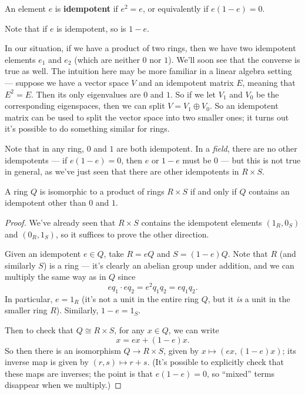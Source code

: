 \begin{definition}
    An element $e$ is \textbf{idempotent} if $e^2 = e$, or equivalently if $e(1 - e) = 0$. 
\end{definition}

Note that if $e$ is idempotent, so is $1 - e$. 

In our situation, if we have a product of two rings, then we have two idempotent elements $e_1$ and $e_2$ (which are neither $0$ nor $1$). We'll soon see that the converse is true as well. The intuition here may be more familiar in a linear algebra setting --- suppose we have a vector space $V$ and an idempotent matrix $E$, meaning that $E^2 = E$. Then its only eigenvalues are $0$ and $1$. So if we let $V_1$ and $V_0$ be the corresponding eigenspaces, then we can split $V = V_1 \oplus V_0$. So an idempotent matrix can be used to split the vector space into two smaller ones; it turns out it's possible to do something similar for rings.

Note that in any ring, $0$ and $1$ are both idempotent. In a \emph{field}, there are no other idempotents --- if $e(1 - e) = 0$, then $e$ or $1 - e$ must be $0$ --- but this is not true in general, as we've just seen that there are other idempotents in $R \times S$.

\begin{proposition}
A ring $Q$ is isomorphic to a product of rings $R \times S$ if and only if $Q$ contains an idempotent other than $0$ and $1$. 
\end{proposition}

\begin{proof}
We've already seen that $R \times S$ contains the idempotent elements $(1_R, 0_S)$ and $(0_R, 1_S)$, so it suffices to prove the other direction.  

Given an idempotent $e \in Q$, take $R = eQ$ and $S = (1 - e)Q$. Note that $R$ (and similarly $S$) is a ring --- it's clearly an abelian group under addition, and we can multiply the same way as in $Q$ since \[eq_1\cdot eq_2 = e^2q_1q_2 = eq_1q_2.\] In particular, $e = 1_R$ (it's not a unit in the entire ring $Q$, but it \emph{is} a unit in the smaller ring $R$). Similarly, $1 - e = 1_S$. 

Then to check that $Q \cong R \times S$, for any $x \in Q$, we can write \[x = ex + (1 - e)x.\] So then there is an isomorphism $Q \to R \times S$, given by $x \mapsto (ex, (1 - e)x)$; its inverse map is given by $(r, s) \mapsto r + s$. (It's possible to explicitly check that these maps are inverses; the point is that $e(1 - e) = 0$, so ``mixed'' terms disappear when we multiply.)
\end{proof}

